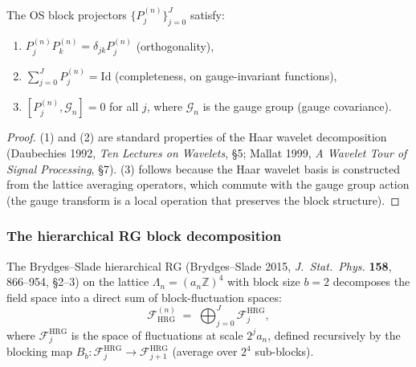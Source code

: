 \begin{lemma}
\label{lem:os_block_algebra}
The OS block projectors $\{P_{j}^{(n)}\}_{j=0}^{J}$ satisfy:
\begin{enumerate}
\item $P_{j}^{(n)}P_{k}^{(n)}=\delta_{jk}P_{j}^{(n)}$
(orthogonality),
\item $\sum_{j=0}^{J}P_{j}^{(n)}=\mathrm{Id}$
(completeness, on gauge-invariant functions),
\item $[P_{j}^{(n)},\mathcal{G}_{n}]=0$ for all $j$, where
$\mathcal{G}_{n}$ is the gauge group (gauge covariance).
\end{enumerate}
\end{lemma}

\begin{proof}
(1) and (2) are standard properties of the Haar wavelet
decomposition (Daubechies 1992, \emph{Ten Lectures on Wavelets},
\S 5; Mallat 1999, \emph{A Wavelet Tour of Signal Processing},
\S 7). (3) follows because the Haar wavelet basis is constructed
from the lattice averaging operators, which commute with the
gauge group action (the gauge transform is a local operation that
preserves the block structure).
\end{proof}

\subsubsection{The hierarchical RG block decomposition}

The Brydges--Slade hierarchical RG (Brydges--Slade 2015,
\emph{J.\ Stat.\ Phys.} \textbf{158}, 866--954, \S 2--3) on the
lattice $\Lambda_{n}=(a_{n}\mathbb{Z})^{4}$ with block size $b=2$
decomposes the field space into a direct sum of block-fluctuation
spaces:
\begin{equation}
\label{eq:hrg_decomp}
  \mathcal{F}_{\mathrm{HRG}}^{(n)}
  \;=\;\bigoplus_{j=0}^{J}\mathcal{F}_{j}^{\mathrm{HRG}},
\end{equation}
where $\mathcal{F}_{j}^{\mathrm{HRG}}$ is the space of
fluctuations at scale $2^{j}a_{n}$, defined recursively by the
blocking map $B_{b}:\mathcal{F}_{j}^{\mathrm{HRG}}\to
\mathcal{F}_{j+1}^{\mathrm{HRG}}$ (average over $2^{4}$ sub-blocks).

